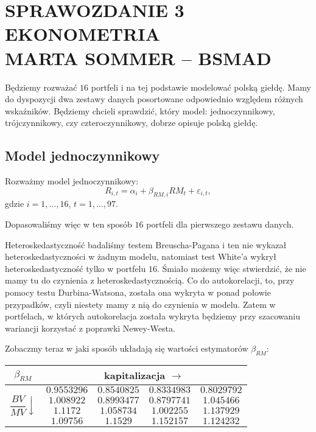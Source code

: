 \documentclass[11pt,a4paper]{report}
\begin{document}
\section*{\centering SPRAWOZDANIE 3 \\ EKONOMETRIA \\ MARTA SOMMER -- BSMAD}

Będziemy rozważać $16$ portfeli i na tej podstawie modelować polską giełdę. Mamy do dyspozycji dwa zestawy danych posortowane odpowiednio względem różnych wskaźników. Będziemy chcieli sprawdzić, który model: jednoczynnikowy, trójczynnikowy, czy czteroczynnikowy, dobrze opisuje polską giełdę.

\subsection*{Model jednoczynnikowy}

Rozważmy model jednoczynnikowy:
$$
R_{i,t}=\alpha_i + \beta_{RM,i}RM_t+\varepsilon_{i,t},
$$
gdzie $i=1,\ldots,16$, $t=1,\ldots,97$.

Dopasowaliśmy więc w ten sposób $16$ portfeli dla pierwszego zestawu danych.

Heteroskedastyczność badaliśmy testem Breuscha-Pagana i ten nie wykazał heteroskedastyczności w żadnym modelu, natomiast test White'a wykrył heteroskedastyczność tylko w portfelu $16$. Śmiało możemy więc stwierdzić, że nie mamy tu do czynienia z heteroskedastycznością. Co do autokorelacji, to, przy pomocy testu Durbina-Watsona, została ona wykryta w ponad połowie przypadków, czyli niestety mamy z nią do czynienia w modelu. Zatem w portfelach, w których autokorelacja została wykryta będziemy przy szacowaniu wariancji korzystać z poprawki Newey-Westa.  

Zobaczmy teraz w jaki sposób układają się wartości estymatorów $\beta_{RM}$:

\bigskip

\begin{center}
\begin{tabular}{|c|c|c|c|c|}
\hline
$\beta_{RM}$ & \multicolumn{4}{|c|}{kapitalizacja $\longrightarrow$}  \\ \hline 
\multirow{4}{*}{$\dfrac{BV}{MV} \downarrow$}  & $ 0.9553296 $ & $ 0.8540825 $ & $ 0.8334983 $ & $ 0.8029792 $ \\ \cline{2-5} 
 & $ 1.008922 $ & $ 0.8993477 $ & $ 0.8797741 $ & $ 1.045466 $ \\ \cline{2-5} 
 & $ 1.1172 $ & $ 1.058734 $ & $ 1.002255 $ & $ 1.137929 $ \\ \cline{2-5} 
 & $ 1.09756 $ & $ 1.1529 $ & $ 1.152157 $ & $ 1.124232 $ \\ \hline
\end{tabular}
\end{center}
\end{document}
